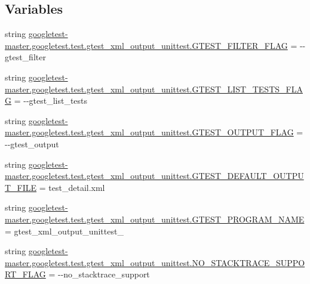 \subsection*{Variables}
\begin{DoxyCompactItemize}
\item 
string \mbox{\hyperlink{namespacegoogletest-master_1_1googletest_1_1test_1_1gtest__xml__output__unittest_a0bd626b3d6a5b6cd217d2e09e367f34e}{googletest-\/master.\+googletest.\+test.\+gtest\+\_\+xml\+\_\+output\+\_\+unittest.\+G\+T\+E\+S\+T\+\_\+\+F\+I\+L\+T\+E\+R\+\_\+\+F\+L\+AG}} = \textquotesingle{}-\/-\/gtest\+\_\+filter\textquotesingle{}
\item 
string \mbox{\hyperlink{namespacegoogletest-master_1_1googletest_1_1test_1_1gtest__xml__output__unittest_aea483b62493731267da168e0958b1e74}{googletest-\/master.\+googletest.\+test.\+gtest\+\_\+xml\+\_\+output\+\_\+unittest.\+G\+T\+E\+S\+T\+\_\+\+L\+I\+S\+T\+\_\+\+T\+E\+S\+T\+S\+\_\+\+F\+L\+AG}} = \textquotesingle{}-\/-\/gtest\+\_\+list\+\_\+tests\textquotesingle{}
\item 
string \mbox{\hyperlink{namespacegoogletest-master_1_1googletest_1_1test_1_1gtest__xml__output__unittest_ac8a5dd2279bdc7c0b25afd6e9e719ce3}{googletest-\/master.\+googletest.\+test.\+gtest\+\_\+xml\+\_\+output\+\_\+unittest.\+G\+T\+E\+S\+T\+\_\+\+O\+U\+T\+P\+U\+T\+\_\+\+F\+L\+AG}} = \textquotesingle{}-\/-\/gtest\+\_\+output\textquotesingle{}
\item 
string \mbox{\hyperlink{namespacegoogletest-master_1_1googletest_1_1test_1_1gtest__xml__output__unittest_abd8eace8011563151297d74eb70e0322}{googletest-\/master.\+googletest.\+test.\+gtest\+\_\+xml\+\_\+output\+\_\+unittest.\+G\+T\+E\+S\+T\+\_\+\+D\+E\+F\+A\+U\+L\+T\+\_\+\+O\+U\+T\+P\+U\+T\+\_\+\+F\+I\+LE}} = \textquotesingle{}test\+\_\+detail.\+xml\textquotesingle{}
\item 
string \mbox{\hyperlink{namespacegoogletest-master_1_1googletest_1_1test_1_1gtest__xml__output__unittest_a0965a84cceaedb249813aff903293748}{googletest-\/master.\+googletest.\+test.\+gtest\+\_\+xml\+\_\+output\+\_\+unittest.\+G\+T\+E\+S\+T\+\_\+\+P\+R\+O\+G\+R\+A\+M\+\_\+\+N\+A\+ME}} = \textquotesingle{}gtest\+\_\+xml\+\_\+output\+\_\+unittest\+\_\+\textquotesingle{}
\item 
string \mbox{\hyperlink{namespacegoogletest-master_1_1googletest_1_1test_1_1gtest__xml__output__unittest_aedff93465d4c404f96e7f115cd17c785}{googletest-\/master.\+googletest.\+test.\+gtest\+\_\+xml\+\_\+output\+\_\+unittest.\+N\+O\+\_\+\+S\+T\+A\+C\+K\+T\+R\+A\+C\+E\+\_\+\+S\+U\+P\+P\+O\+R\+T\+\_\+\+F\+L\+AG}} = \textquotesingle{}-\/-\/no\+\_\+stacktrace\+\_\+support\textquotesingle{}

\end{DoxyCompactItemize}
